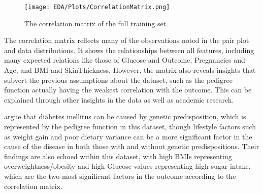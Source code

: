 \begin{figure}[H]
    \centering
    \texttt{[image: EDA/Plots/CorrelationMatrix.png]}
    \caption{The correlation matrix of the full training set.}
    \label{fig:CorrMatrix}
\end{figure}

\para The correlation matrix reflects many of the observations noted in the pair plot and data distributions.
It shows the relationships between all features, including many expected relations like those of Glucose and Outcome,
Pregnancies and Age, and BMI and SkinThickness. However, the matrix also reveals insights that subvert the previous 
assumptions about the dataset, such as the pedigree function actually having the weakest correlation with the outcome.
This can be explained through other insights in the data as well as academic research.

\para \textcite{mambiya_play_2019} argue that diabetes mellitus can be caused by genetic predisposition, which is 
represented by the pedigree function in this dataset, though lifestyle factors such as weight gain and poor dietary 
variance can be a more significant factor in the cause of the disease in both those with and without genetic predispositions.
Their findings are also echoed within this dataset, with high BMIs representing overweightness/obesity and high Glucose values representing 
high sugar intake, which are the two most significant factors in the outcome according to the correlation matrix.

\endgroup